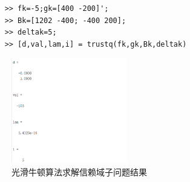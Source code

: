 \documentclass[12pt]{article} %
\begin{document}
	\begin{lstlisting}
	>> fk=-5;gk=[400 -200]';
	>> Bk=[1202 -400; -400 200];
	>> deltak=5;
	>> [d,val,lam,i] = trustq(fk,gk,Bk,deltak)
	\end{lstlisting}
	\begin{figure}[ht]
	\centering
	\includegraphics[width=0.45\textwidth]{trustq.png}
	\caption{光滑牛顿算法求解信赖域子问题结果}
	\label{fig:fig1}
	\end{figure}
\end{document}
